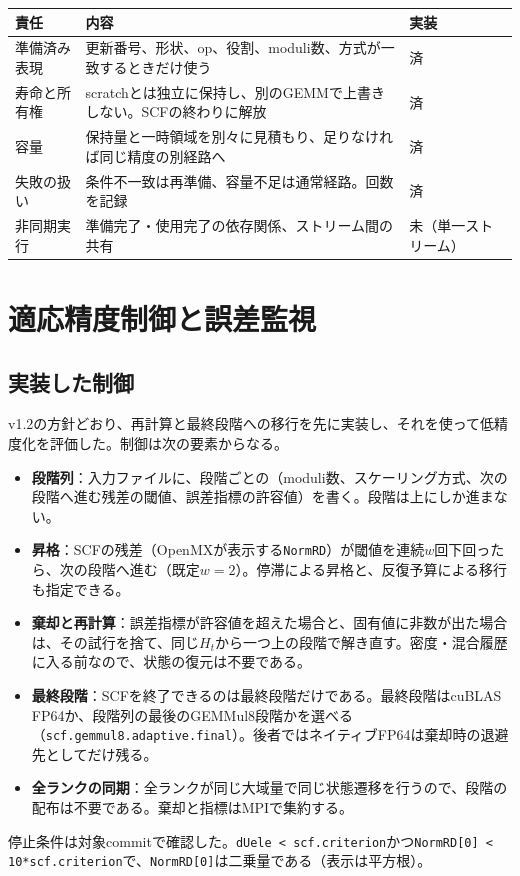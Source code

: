 \documentclass[a4paper,11pt]{ltjsarticle}
\newcommand{\code}[1]{\texttt{#1}}
\begin{document}
\noindent\begin{tabularx}{\linewidth}{@{}p{34mm}Yp{22mm}@{}}
\toprule
責任 & 内容 & 実装\\
\midrule
準備済み表現 & 更新番号、形状、op、役割、moduli数、方式が一致するときだけ使う & 済\\
寿命と所有権 & scratchとは独立に保持し、別のGEMMで上書きしない。SCFの終わりに解放 & 済\\
容量 & 保持量と一時領域を別々に見積もり、足りなければ同じ精度の別経路へ & 済\\
失敗の扱い & 条件不一致は再準備、容量不足は通常経路。回数を記録 & 済\\
非同期実行 & 準備完了・使用完了の依存関係、ストリーム間の共有 & 未（単一ストリーム）\\
\bottomrule
\end{tabularx}

\section{適応精度制御と誤差監視}\label{sec:control}
\subsection{実装した制御}\label{sec:impl-control}
v1.2の方針どおり、再計算と最終段階への移行を先に実装し、それを使って低精度化を評価した。制御は次の要素からなる。
\begin{itemize}
\item \textbf{段階列}：入力ファイルに、段階ごとの（moduli数、スケーリング方式、次の段階へ進む残差の閾値、誤差指標の許容値）を書く。段階は上にしか進まない。
\item \textbf{昇格}：SCFの残差（OpenMXが表示する\code{NormRD}）が閾値を連続$w$回下回ったら、次の段階へ進む（既定$w=2$）。停滞による昇格と、反復予算による移行も指定できる。
\item \textbf{棄却と再計算}：誤差指標が許容値を超えた場合と、固有値に非数が出た場合は、その試行を捨て、同じ$H_t$から一つ上の段階で解き直す。密度・混合履歴に入る前なので、状態の復元は不要である。
\item \textbf{最終段階}：SCFを終了できるのは最終段階だけである。最終段階はcuBLAS FP64か、段階列の最後のGEMMul8段階かを選べる（\code{scf.gemmul8.adaptive.final}）。後者ではネイティブFP64は棄却時の退避先としてだけ残る。
\item \textbf{全ランクの同期}：全ランクが同じ大域量で同じ状態遷移を行うので、段階の配布は不要である。棄却と指標はMPIで集約する。
\end{itemize}
停止条件は対象commitで確認した。\code{dUele < scf.criterion}かつ\code{NormRD[0] < 10*scf.criterion}で、\code{NormRD[0]}は二乗量である（表示は平方根）。
\end{document}
